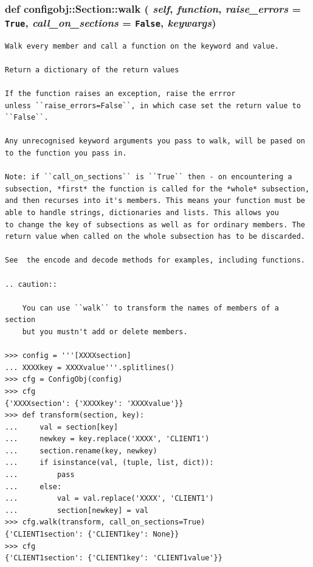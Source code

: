\subsubsection{\setlength{\rightskip}{0pt plus 5cm}def configobj::Section::walk ( {\em self},  {\em function},  {\em raise\_\-errors} = {\tt True},  {\em call\_\-on\_\-sections} = {\tt False},  {\em keywargs})}\label{classconfigobj_1_1Section_388e6c9ae458cd8bc2fac634e9bbc9bd}




\footnotesize\begin{verbatim}
Walk every member and call a function on the keyword and value.

Return a dictionary of the return values

If the function raises an exception, raise the errror
unless ``raise_errors=False``, in which case set the return value to
``False``.

Any unrecognised keyword arguments you pass to walk, will be pased on
to the function you pass in.

Note: if ``call_on_sections`` is ``True`` then - on encountering a
subsection, *first* the function is called for the *whole* subsection,
and then recurses into it's members. This means your function must be
able to handle strings, dictionaries and lists. This allows you
to change the key of subsections as well as for ordinary members. The
return value when called on the whole subsection has to be discarded.

See  the encode and decode methods for examples, including functions.

.. caution::

    You can use ``walk`` to transform the names of members of a section
    but you mustn't add or delete members.

>>> config = '''[XXXXsection]
... XXXXkey = XXXXvalue'''.splitlines()
>>> cfg = ConfigObj(config)
>>> cfg
{'XXXXsection': {'XXXXkey': 'XXXXvalue'}}
>>> def transform(section, key):
...     val = section[key]
...     newkey = key.replace('XXXX', 'CLIENT1')
...     section.rename(key, newkey)
...     if isinstance(val, (tuple, list, dict)):
...         pass
...     else:
...         val = val.replace('XXXX', 'CLIENT1')
...         section[newkey] = val
>>> cfg.walk(transform, call_on_sections=True)
{'CLIENT1section': {'CLIENT1key': None}}
>>> cfg
{'CLIENT1section': {'CLIENT1key': 'CLIENT1value'}}
\end{verbatim}
\normalsize
